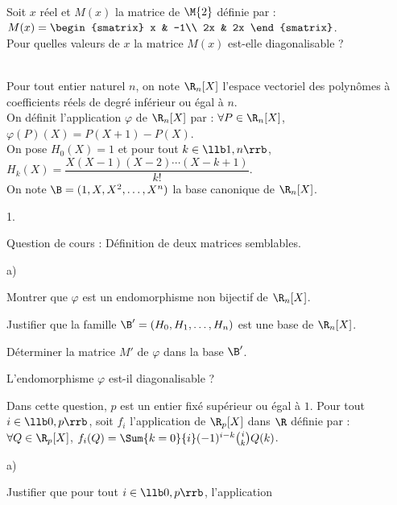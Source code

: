 \documentclass[11pt]{article}%
\begin{document}
\begin{exerciceSP}~\\
  Soit $x$ réel et $M(x)$ la matrice de $\M{2}$ définie par : $M(x)
  = \begin{smatrix}
    x & -1\\
    2x & 2x
  \end{smatrix}$.\\
  Pour quelles valeurs de $x$ la matrice $M(x)$ est-elle
  diagonalisable ?
\end{exerciceSP}


\newpage


\begin{exerciceAP}~\\
  Pour tout entier naturel $n$, on note $\R_n[X]$ l'espace vectoriel
  des polynômes à coefficients réels de degré inférieur ou égal à $n$.\\
  On définit l'application $\varphi$ de $\R_n[X]$ par : $\forall
  P\in\R_n[X]$, $\varphi(P)(X) = P(X+1) - P(X)$.\\
  On pose $H_0(X)=1$ et pour tout $k\in\llb 1,n\rrb$,
  $H_k(X)=\dfrac{X(X-1)(X-2)\cdots(X-k+1)}{k!}.$\\
  On note $\B=(1,X,X^2,\hdots,X^n)$ la base canonique de $\R_n[X]$.
  \begin{noliste}{1.}
    \setlength{\itemsep}{2mm}
  \item Question de cours : Définition de deux matrices semblables.
  \item 
    \begin{noliste}{a)}
    \setlength{\itemsep}{2mm}
    \item Montrer que $\varphi$ est un endomorphisme non bijectif de
      $\R_n[X]$.
    \item Justifier que la famille $\B'=(H_0,H_1,\hdots,H_n)$ est une
      base de $\R_n[X]$.
    \item Déterminer la matrice $M'$ de $\varphi$ dans la base $\B'$.
    \item L'endomorphisme $\varphi$ est-il diagonalisable ?
    \end{noliste}
  \item Dans cette question, $p$ est un entier fixé supérieur ou égal
    à $1$. Pour tout $i\in\llb 0,p\rrb$, soit $f_i$ l'application de
    $\R_p[X]$ dans $\R$ définie par : $\forall Q\in\R_p[X]$,
    $f_i(Q)=\Sum{k=0}{i} (-1)^{i-k} \binom{i}{k} Q(k)$.
    \begin{noliste}{a)}
    \setlength{\itemsep}{2mm}
    \item Justifier que pour tout $i\in\llb 0,p\rrb$, l'application

\end{noliste}
\end{noliste}
\end{exerciceAP}
\end{document}

